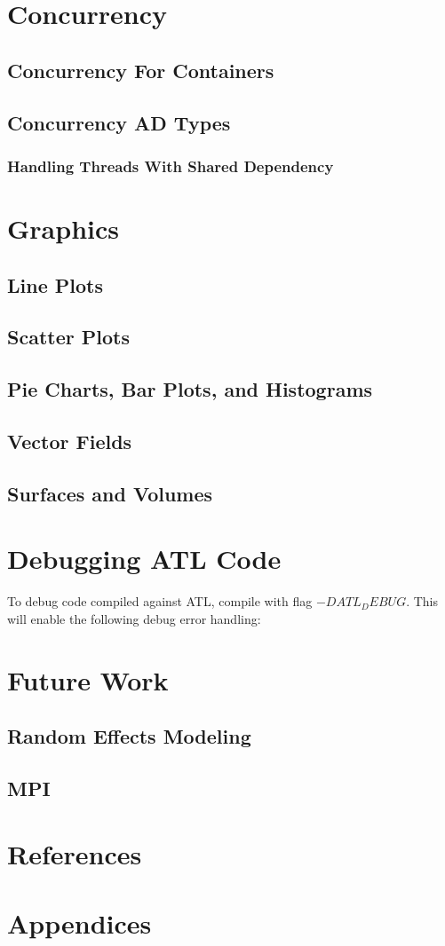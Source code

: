\documentclass[12pt,a4paper]{article}
\begin{document}
\section{Concurrency}
\subsection{Concurrency For Containers}
\subsection{Concurrency AD Types}
\subsubsection{Handling Threads With Shared Dependency}
\section{Graphics}
\subsection{Line Plots}
\subsection{Scatter Plots}
\subsection{Pie Charts, Bar Plots, and Histograms}
\subsection{Vector Fields}
\subsection{Surfaces and Volumes}
\section{Debugging ATL Code}
To debug code compiled against ATL, compile with flag $-DATL_DEBUG$. This will enable the following debug error handling:
\section{Future Work}
\subsection{Random Effects Modeling}
\subsection{MPI}
\section{References}
\section{Appendices}
\end{document}
